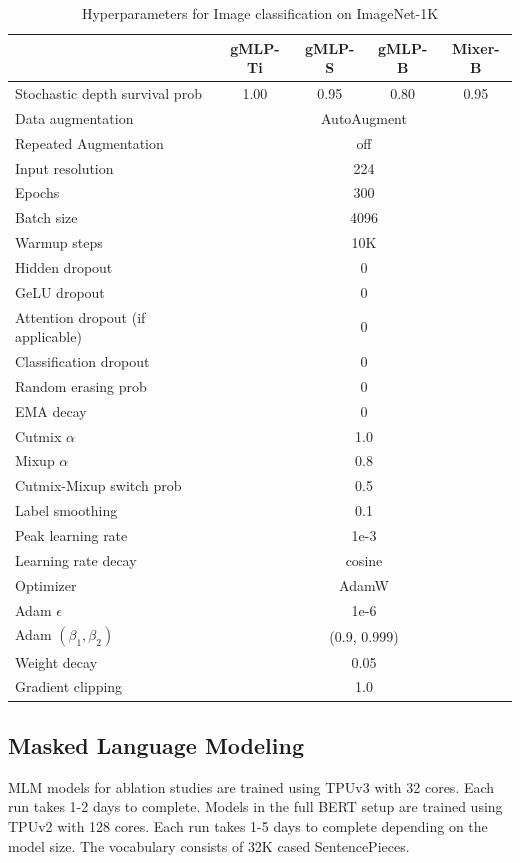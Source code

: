 \documentclass{article}
\newcommand{\gffn}{gMLP\xspace}
\begin{document}
\begin{table}[h]
\centering
\begin{tabular}{@{}l|cccc@{}}
\toprule
 & \gffn-Ti & \gffn-S & \gffn-B & Mixer-B \\ \midrule
Stochastic depth survival prob & 1.00 & 0.95 & 0.80 & 0.95 \\
\midrule
Data augmentation & \multicolumn{4}{c}{AutoAugment} \\
Repeated Augmentation & \multicolumn{4}{c}{off} \\
Input resolution & \multicolumn{4}{c}{224} \\
Epochs & \multicolumn{4}{c}{300} \\
Batch size & \multicolumn{4}{c}{4096} \\
Warmup steps & \multicolumn{4}{c}{10K} \\
Hidden dropout & \multicolumn{4}{c}{0} \\
GeLU dropout & \multicolumn{4}{c}{0} \\
Attention dropout (if applicable) & \multicolumn{4}{c}{0} \\
Classification dropout & \multicolumn{4}{c}{0} \\
Random erasing prob & \multicolumn{4}{c}{0} \\
EMA decay & \multicolumn{4}{c}{0} \\
Cutmix $\alpha$ & \multicolumn{4}{c}{1.0} \\
Mixup $\alpha$ & \multicolumn{4}{c}{0.8} \\
Cutmix-Mixup switch prob & \multicolumn{4}{c}{0.5} \\
Label smoothing & \multicolumn{4}{c}{0.1} \\
Peak learning rate & \multicolumn{4}{c}{1e-3} \\
Learning rate decay & \multicolumn{4}{c}{cosine} \\
Optimizer & \multicolumn{4}{c}{AdamW} \\
Adam $\epsilon$ & \multicolumn{4}{c}{1e-6} \\
Adam $(\beta_1, \beta_2)$ & \multicolumn{4}{c}{(0.9, 0.999)} \\
Weight decay & \multicolumn{4}{c}{0.05} \\
Gradient clipping & \multicolumn{4}{c}{1.0} \\
\bottomrule
\end{tabular}
\caption{Hyperparameters for Image classification on ImageNet-1K}
\end{table}

\FloatBarrier
\subsection{Masked Language Modeling}
\label{sec:mlm-hparams}
MLM models for ablation studies are trained using TPUv3 with 32 cores. Each run takes 1-2 days to complete. Models in the full BERT setup are trained using TPUv2 with 128 cores. Each run takes 1-5 days to complete depending on the model size. The vocabulary consists of 32K cased SentencePieces.
\end{document}
